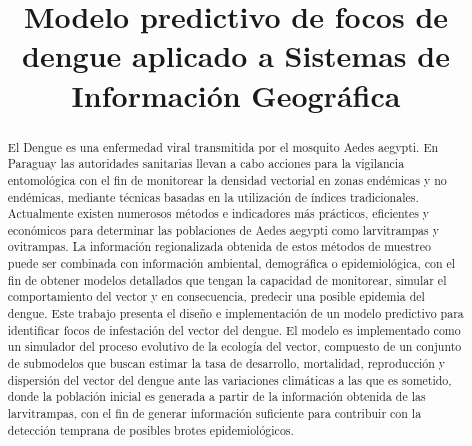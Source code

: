 \documentclass[conference]{IEEEtran}
\begin{document}
%
\title{Modelo predictivo de focos de dengue aplicado a Sistemas de Información Geográfica}


\author{
}

\maketitle

\begin{abstract}
El Dengue es una enfermedad viral transmitida por el mosquito Aedes aegypti. En Paraguay las autoridades sanitarias llevan a cabo acciones para la vigilancia entomológica con el fin de monitorear la densidad vectorial en zonas endémicas y no endémicas, mediante técnicas basadas en la utilización de índices tradicionales. Actualmente existen numerosos métodos e indicadores más prácticos, eficientes y económicos para determinar las poblaciones de Aedes aegypti como larvitrampas y ovitrampas. La información regionalizada obtenida de estos métodos de muestreo puede ser combinada con información ambiental, demográfica o epidemiológica, con el fin de obtener modelos detallados que tengan la capacidad de monitorear, simular el comportamiento del vector y en consecuencia, predecir una posible epidemia del dengue. Este trabajo presenta el diseño e implementación de un modelo predictivo para identificar focos de infestación del vector del dengue. El modelo es implementado como un simulador del proceso evolutivo de la ecología del vector, compuesto de un conjunto de submodelos que buscan estimar la tasa de desarrollo, mortalidad, reproducción y dispersión del vector del dengue ante las variaciones climáticas a las que es sometido, donde la población inicial es generada a partir de la información obtenida de las larvitrampas, con el fin de generar información suficiente para contribuir con la detección temprana de posibles brotes epidemiológicos.
\end{abstract}
\end{document}
